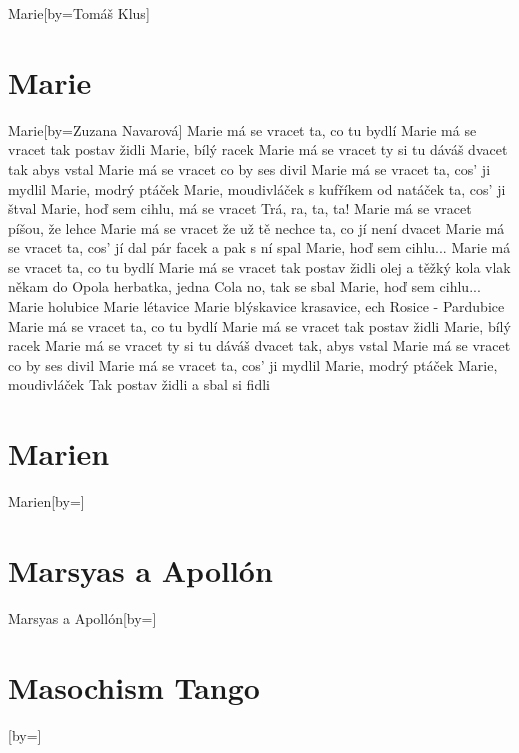 \documentclass{article}
\begin{document}
\begin{songs}{}
\begin{song}{Marie}[by={Tomáš Klus}]
\endverse
\end{song}

\section{Marie}
\begin{song}{Marie}[by={Zuzana Navarová}]
\beginverse
Marie má se vracet
ta, co tu bydlí
Marie má se vracet
tak postav židli
Marie, bílý racek
Marie má se vracet
ty si tu dáváš dvacet
tak abys vstal
Marie má se vracet
co by ses divil
Marie má se vracet
ta, cos' ji mydlil
Marie, modrý ptáček
Marie, moudivláček
s kufříkem od natáček
ta, cos' ji štval
Marie, hoď sem cihlu, má se vracet
Trá, ra, ta, ta! 
\endverse
\beginverse
Marie má se vracet
píšou, že lehce
Marie má se vracet
že už tě nechce
ta, co jí není dvacet
Marie má se vracet
ta, cos' jí dal pár facek
a pak s ní spal
\endverse
\beginverse
Marie, hoď sem cihlu...
\endverse
\beginverse
Marie má se vracet
ta, co tu bydlí
Marie má se vracet
tak postav židli
olej a těžký kola
vlak někam do Opola
herbatka, jedna Cola
no, tak se sbal
\endverse
\beginverse
Marie, hoď sem cihlu...
\endverse
\beginverse
Marie holubice
Marie létavice
Marie blýskavice
krasavice, ech
Rosice - Pardubice
\endverse
\beginverse
Marie má se vracet
ta, co tu bydlí
Marie má se vracet
tak postav židli
Marie, bílý racek
Marie má se vracet
ty si tu dáváš dvacet
tak, abys vstal
\endverse
\beginverse
Marie má se vracet
co by ses divil
Marie má se vracet
ta, cos' ji mydlil
Marie, modrý ptáček
Marie, moudivláček
Tak postav židli
a sbal si fidli 
\endverse
\end{song}

\section{Marien}
\begin{song}{Marien}[by={}]
\beginverse

\endverse
\end{song}

\section{Marsyas a Apollón}
\begin{song}{Marsyas a Apollón}[by={}]
\beginverse

\endverse
\end{song}

\section{Masochism Tango}
\begin{song}{}[by={}]
\beginverse


\end{song}
\end{songs}
\end{document}
